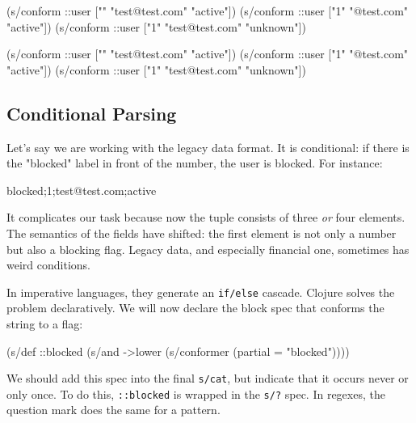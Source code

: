 \begin{english}
  \begin{clojure}
(s/conform ::user
  ["" "test@test.com" "active"])
(s/conform ::user
  ["1" "@test.com" "active"])
(s/conform ::user
  ["1" "test@test.com" "unknown"])
  \end{clojure}
\end{english}

\else

\begin{english}
 \begin{clojure}
(s/conform ::user ["" "test@test.com" "active"])
(s/conform ::user ["1" "@test.com" "active"])
(s/conform ::user ["1" "test@test.com" "unknown"])
  \end{clojure}
\end{english}

\fi

\subsection{Conditional Parsing}

Let's say we are working with the legacy data format. It is conditional: if there is the "blocked" label in front of the number, the user is blocked. For instance:

\begin{english}
  \begin{text}
blocked;1;test@test.com;active
  \end{text}
\end{english}

It complicates our task because now the tuple consists of three
\emph{or} four elements. The semantics of the fields have shifted: the first element is not only a number but also a blocking flag. Legacy data, and especially financial one, sometimes has weird conditions.

In imperative languages, they generate an \verb|if/else| cascade. Clojure solves the problem declaratively. We will now declare the block spec that conforms the string to a flag:

\begin{english}
  \begin{clojure}
(s/def ::blocked
  (s/and
   ->lower
   (s/conformer (partial = "blocked"))))
  \end{clojure}
\end{english}


We should add this spec into the final \verb|s/cat|, but indicate that it occurs never or only once. To do this, \verb|::blocked| is wrapped in the \verb|s/?| spec. In regexes, the question mark does the same for a pattern.

